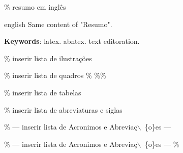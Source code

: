 \documentclass[11pt]{article}
\begin{document}
\% resumo em inglês
\begin{resumo}[Abstract]
 \begin{otherlanguage*}{english}
   Same content of "Resumo".

   \vspace{\onelineskip}

   \noindent
   \textbf{Keywords}: latex. abntex. text editoration.
 \end{otherlanguage*}
\end{resumo}


\% inserir lista de ilustrações
\listoffigures*
\cleardoublepage


\% inserir lista de quadros
\%
\%\listofquadros*
\%\cleardoublepage


\% inserir lista de tabelas
\listoftables*
\cleardoublepage


\% inserir lista de abreviaturas e siglas

\% --- inserir lista de Acronimos e Abrevia\c{c}$\backslash$~\{o\}es ---
\printglossary[type=\acronymtype,title=\{List of Abbreviations\}]
\cleardoublepage

\% --- inserir lista de Acronimos e Abrevia\c{c}$\backslash$~\{o\}es ---
\%
\end{document}
